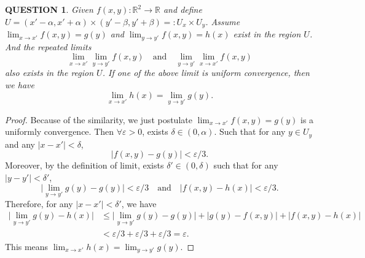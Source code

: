 \documentclass[12pt]{article}
\renewcommand{\(}{\left(}%
\renewcommand{\)}{\right)}%
\renewcommand{\[}{\left[}%
\renewcommand{\]}{\right]}%
\renewcommand{\r}{\mathbb{R}}
\newtheorem{question}{QUESTION}[section]}
\newtheorem{proof}{Proof.}}
\begin{document}
  \begin{question}
    Given $f(x,y):\r^2\to\r$ and define $U=(x'-\alpha ,x'+\alpha )\times(y'-\beta,y'+\beta)=:U_x\times U_y$. Assume  $\lim_{x\to x'}f(x,y)=g(y)$ and $\lim_{y\to y'}f(x,y)=h(x)$ exist in the region $U$. And the repeated limits 
    \begin{equation*}
    	\lim_{x\to x'}\lim_{y\to y'}f(x,y)\quad\mathrm{and} \quad\lim_{y\to y'}\lim_{x\to x'}f(x,y)
    \end{equation*}
     also exists in the region $U$. If one of the above limit is uniform convergence, then we have
    \begin{equation*}
      \lim_{x\to x'}h(x)=\lim_{y\to y'}g(y).
    \end{equation*}
  \end{question}
  \begin{proof}
    Because of the similarity, we just postulate  $\lim_{x\to x'}f(x,y)=g(y)$ is a uniformly convergence. Then $\forall\varepsilon>0$, exists $\delta\in(0,\alpha)$. Such that for any $y\in U_y$ and any $|x-x'|<\delta$,
    \begin{equation*}
      |f(x,y)- g(y)|<\varepsilon/3.
    \end{equation*}
    Moreover, by the definition of limit, exists $\delta'\in(0,\delta)$ such that for any $|y-y'|<\delta'$,
    \begin{equation*}
    	\Big|\lim_{y\to y'}g(y)- g(y)\Big|<\varepsilon/3\quad\mathrm{and} \quad |f(x,y)- h(x)|<\varepsilon/3.
    \end{equation*}
    Therefore, for any $|x-x'|<\delta'$, we have
    \begin{equation*}
      \begin{split}
         \Big|\lim_{y\to y'}g(y)-h(x)\Big|&\leq \Big|\lim_{y\to y'}g(y)- g(y)\Big|+|g(y)- f(x,y)|+|f(x,y)- h(x)| \\
           &<\varepsilon/3+\varepsilon/3+\varepsilon/3=\varepsilon.
      \end{split}
    \end{equation*}
    This means $\lim_{x\to x'}h(x)=\lim_{y\to y'}g(y)$.
  \end{proof}
  
\end{document}
